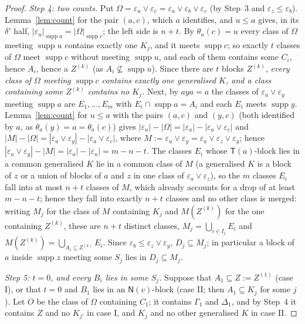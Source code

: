 \documentclass[11pt]{amsart}
\theoremstyle{definition}
\newcommand{\supp}{\operatorname{supp}}
\newcommand{\T}{\mathsf{T}}
\newcommand{\N}{\mathsf{N}}
\begin{document}
\begin{proof}
\smallskip\emph{Step 4: two counts.} Put $\Omega=\varepsilon_u\vee\varepsilon_c=\varepsilon_a\vee\varepsilon_b\vee\varepsilon_c$ (by Step~3 and $\varepsilon_z\le\varepsilon_b$). Lemma~\ref{lem:count} for the pair $(a,c)$, which $a$ identifies, and $u\le a$ gives, in its $\delta'$ half, $|\varepsilon_u|_{\supp a}=|\Omega|_{\supp c}$; the left side is $n+t$. By $\theta_u(c)=u$ every class of $\Omega$ meeting $\supp u$ contains exactly one $K_j$, and it meets $\supp c$; so exactly $t$ classes of $\Omega$ meet $\supp c$ without meeting $\supp u$, and each of them contains some $C_i$, hence $A_i$, hence a $Z^{(k)}$ (as $A_i\not\subseteq\supp u$). Since there are $t$ blocks $Z^{(k)}$, \emph{every class of $\Omega$ meeting $\supp c$ contains exactly one generalised $K$, and a class containing some $Z^{(k)}$ contains no $K_j$.} Next, by $aya=a$ the classes of $\varepsilon_a\vee\varepsilon_y$ meeting $\supp a$ are $E_1,\dots,E_m$ with $E_i\cap\supp a=A_i$ and each $E_i$ meets $\supp y$. Lemma~\ref{lem:count} for $u\le a$ with the pairs $(a,c)$ and $(y,c)$ (both identified by $a$, as $\theta_a(y)=a=\theta_a(c)$) gives $|\varepsilon_u|-|\Omega|=|\varepsilon_a|-|\varepsilon_a\vee\varepsilon_c|$ and $|M|-|\Omega|=|\varepsilon_a\vee\varepsilon_y|-|\varepsilon_a\vee\varepsilon_c|$, where $M:=\varepsilon_u\vee\varepsilon_y=\varepsilon_a\vee\varepsilon_z\vee\varepsilon_y$; hence $|\varepsilon_a\vee\varepsilon_y|-|M|=|\varepsilon_a|-|\varepsilon_u|=m-n-t$. The classes $E_i$ whose $\T(a)$-block lies in a common generalised $K$ lie in a common class of $M$ (a generalised $K$ is a block of $z$ or a union of blocks of $a$ and $z$ in one class of $\varepsilon_a\vee\varepsilon_z$), so the $m$ classes $E_i$ fall into at most $n+t$ classes of $M$, which already accounts for a drop of at least $m-n-t$; hence they fall into exactly $n+t$ classes and no other class is merged: writing $M_j$ for the class of $M$ containing $K_j$ and $M(Z^{(k)})$ for the one containing $Z^{(k)}$, these are $n+t$ distinct classes, $M_j=\bigcup_{i\in I_j}E_i$ and $M(Z^{(k)})=\bigcup_{A_i\subseteq Z^{(k)}}E_i$. Since $\varepsilon_b\le\varepsilon_z\vee\varepsilon_y$, $D_j\subseteq M_j$; in particular a block of $a$ inside $\supp z$ meeting some $S_j$ lies in $D_j\subseteq M_j$.

\smallskip\emph{Step 5: $t=0$, and every $B_i$ lies in some $S_j$.} Suppose that $A_1\subseteq Z:=Z^{(1)}$ (case I), or that $t=0$ and $B_1$ lies in an $\N(v)$-block (case II; then $A_1\subseteq K_j$ for some $j$). Let $O$ be the class of $\Omega$ containing $C_1$; it contains $\Gamma_1$ and $\Delta_1$, and by Step~4 it contains $Z$ and no $K_{j'}$ in case I, and $K_j$ and no other generalised $K$ in case II.


\end{proof}
\end{document}
